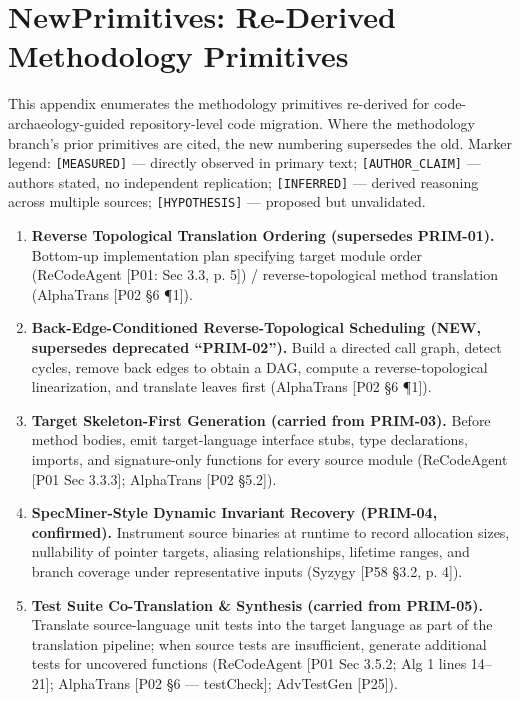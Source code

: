 \section{NewPrimitives: Re-Derived Methodology Primitives}
\label{app:primitives}

This appendix enumerates the methodology primitives re-derived for
code-archaeology-guided repository-level code migration. Where the
methodology branch's prior primitives are cited, the new numbering
supersedes the old. Marker legend: \texttt{[MEASURED]} --- directly
observed in primary text; \texttt{[AUTHOR\_CLAIM]} --- authors stated,
no independent replication; \texttt{[INFERRED]} --- derived reasoning
across multiple sources; \texttt{[HYPOTHESIS]} --- proposed but
unvalidated.

\begin{enumerate}

\item \textbf{Reverse Topological Translation Ordering (supersedes PRIM-01).}
Bottom-up implementation plan specifying target module order (ReCodeAgent [P01: Sec 3.3, p. 5]) / reverse-topological method translation (AlphaTrans [P02 \S6 \P1]).

\item \textbf{Back-Edge-Conditioned Reverse-Topological Scheduling (NEW, supersedes deprecated ``PRIM-02'').}
Build a directed call graph, detect cycles, remove back edges to obtain a DAG, compute a reverse-topological linearization, and translate leaves first (AlphaTrans [P02 \S6 \P1]).

\item \textbf{Target Skeleton-First Generation (carried from PRIM-03).}
Before method bodies, emit target-language interface stubs, type declarations, imports, and signature-only functions for every source module (ReCodeAgent [P01 Sec 3.3.3]; AlphaTrans [P02 \S5.2]).

\item \textbf{SpecMiner-Style Dynamic Invariant Recovery (PRIM-04, confirmed).}
Instrument source binaries at runtime to record allocation sizes, nullability of pointer targets, aliasing relationships, lifetime ranges, and branch coverage under representative inputs (Syzygy [P58 \S3.2, p. 4]).

\item \textbf{Test Suite Co-Translation \& Synthesis (carried from PRIM-05).}
Translate source-language unit tests into the target language as part of the translation pipeline; when source tests are insufficient, generate additional tests for uncovered functions (ReCodeAgent [P01 Sec 3.5.2; Alg 1 lines 14--21]; AlphaTrans [P02 \S6 --- testCheck]; AdvTestGen [P25]).


\end{enumerate}
